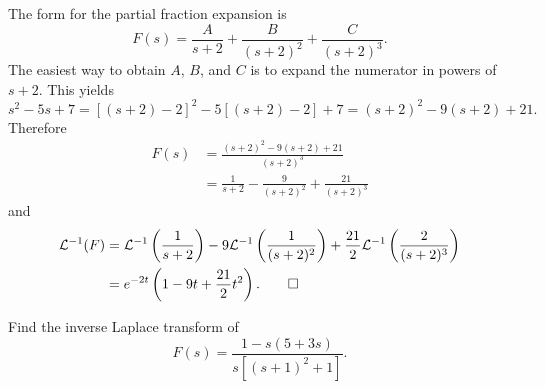 \begin{solution}
The form for the partial fraction expansion  is
\[
F(s)=\frac{A}{s+2}+\frac{B}{(s+2)^2}+\frac{C}{(s+2)^3}.
\]
The easiest way to obtain $A$, $B$, and $C$ is to expand the numerator
in powers of $s+2$. This yields
\[
s^2-5s+7=[(s+2)-2]^2-5[(s+2)-2]+7=(s+2)^2-9(s+2)+21.
\]
Therefore
\begin{align*}
F(s)&=\frac{(s+2)^2-9(s+2)+21}{(s+2)^3}\\
&=\frac{1}{s+2}-\frac{9}{(s+2)^2}+\frac{21}{(s+2)^3}
\end{align*}
and
\begin{align*}
{\mathcal L}^{-1}(F)
&={\mathcal L}^{-1}\left(\frac{1}{s+2}\right)
-9{\mathcal L}^{-1}\left(\frac{1}{(s+2)^2}\right)
+\frac{21}{2}{\mathcal L}^{-1}\left(\frac{2}{(s+2)^3}\right)\\
&=e^{-2t}\left(1-9t+\frac{21}{2}t^2\right).\qedhere
\end{align*}
\end{solution}

\begin{example}\label{example:8.2.8}
 Find the inverse Laplace transform of
\begin{equation}\label{eq:8.2.13}
F(s)=\frac{1-s(5+3s)}{s\left[(s+1)^2+1\right]}.
\end{equation}
\end{example}


